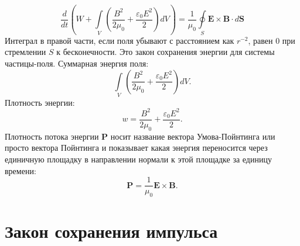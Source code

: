 \documentclass[a4paper,14pt]{extreport} %
\newcommand{\Df}[1]{\frac{d}{d #1}}
\renewcommand{\vec}[1]{\bm{#1}}
\newcommand{\eps}{\varepsilon}
\begin{document}
	\begin{equation*}
		\Df{t} 
		\left(
			W + \int\limits_{V} \left( \frac{B^2}{2\mu_0} + \frac{\eps_0 E^2}{2}\right) dV
		\right) =
		\frac{1}{\mu_0} \oint\limits_{S} \vec{E}\times\vec{B}\cdot d\vec{S}
	\end{equation*}
	Интеграл в правой части, если поля убывают с расстоянием как $r^{-2}$, равен 0 при стремлении $S$ к бесконечности. Это закон сохранения энергии для системы частицы-поля. Суммарная энергия поля:
	\begin{equation*}
		\int\limits_{V} \left( \frac{B^2}{2\mu_0} + \frac{\eps_0 E^2}{2}\right) dV.
	\end{equation*}
	Плотность энергии:
	\begin{equation*}
		w = \frac{B^2}{2\mu_0} + \frac{\eps_0 E^2}{2}.
	\end{equation*}
	Плотность потока энергии $\vec{P}$ носит название вектора Умова-Пойнтинга или просто вектора Пойнтинга и показывает какая энергия переносится через единичную площадку в направлении нормали к этой площадке за единицу времени:
	\begin{equation*}
		\vec{P} = \frac{1}{\mu_0} \vec{E}\times\vec{B}.
	\end{equation*}
	
	\section{Закон сохранения импульса}
	
\end{document}
